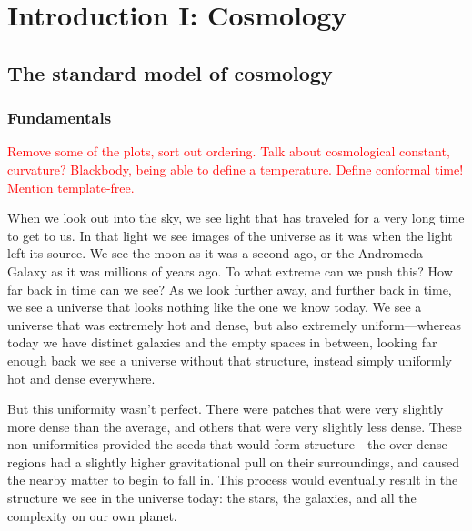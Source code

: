 %
\chapter{Introduction I: Cosmology}\label{chapter:intro_general}
\section{The standard model of cosmology}\label{sec:general_intro}
    \subsection{Fundamentals}
\textcolor{red}{Remove some of the plots, sort out ordering. Talk about cosmological constant, curvature?
Blackbody, being able to define a temperature. Define conformal time!
Mention template-free.}


When we look out into the sky, we see light that has traveled for a very long time to get to us.
In that light we see images of the universe as it was when the light left its source.
We see the moon as it was a second ago, or the Andromeda Galaxy as it was millions of
years ago. To what extreme can we push this? How far back in time can we see? As we look further
away, and further back in time, we see a universe that looks nothing like the one we know today.
We see a universe that was extremely hot and dense, but also extremely uniform---whereas today
we have distinct galaxies and the empty spaces in between, looking far enough back we see a universe
without that structure, instead simply uniformly hot and dense everywhere.


But this uniformity wasn't perfect. There were patches that were very slightly more dense than the average,
and others that were very slightly less dense. These non-uniformities provided the seeds that would form
structure---the over-dense regions had a slightly higher gravitational pull on their surroundings,
and caused the nearby matter to begin to fall in. This process would eventually result in the structure
we see in the universe today: the stars, the galaxies, and all the complexity on our own planet.


